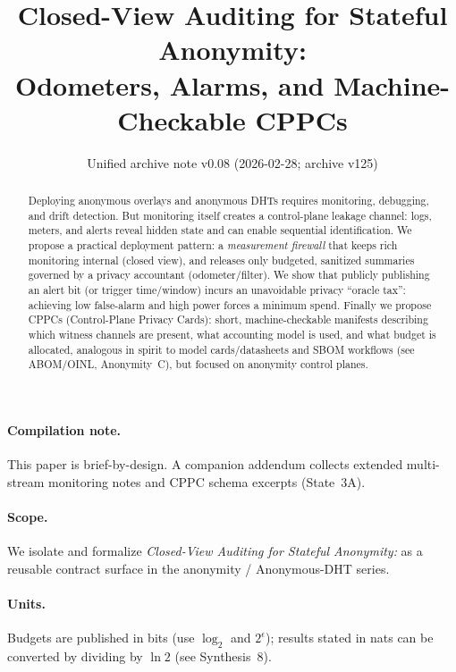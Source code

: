 \documentclass[11pt]{article}
\title{Closed-View Auditing for Stateful Anonymity:\\Odometers, Alarms, and Machine-Checkable CPPCs}
\author{}
\date{Unified archive note v0.08 (2026-02-28; archive v125)}
\begin{document}
\maketitle

\begin{abstract}
Deploying anonymous overlays and anonymous DHTs requires monitoring, debugging, and drift detection.
But monitoring itself creates a control-plane leakage channel: logs, meters, and alerts reveal hidden state
and can enable sequential identification.
We propose a practical deployment pattern: a \emph{measurement firewall} that keeps rich monitoring internal (closed view),
and releases only budgeted, sanitized summaries governed by a privacy accountant (odometer/filter).
We show that publicly publishing an alert bit (or trigger time/window) incurs an unavoidable privacy ``oracle tax'':
achieving low false-alarm and high power forces a minimum spend.
Finally we propose CPPCs (Control-Plane Privacy Cards): short, machine-checkable manifests describing
which witness channels are present, what accounting model is used, and what budget is allocated,
analogous in spirit to model cards/datasheets and SBOM workflows (see ABOM/OINL, Anonymity~C), but focused on anonymity control planes.\cite{series:abomoinl}
\end{abstract}

\paragraph{Compilation note.}
This paper is brief-by-design. A companion addendum collects extended multi-stream monitoring notes and CPPC schema excerpts (State~3A).\cite{series:state3addendum}

\paragraph{Scope.}
We isolate and formalize \emph{Closed-View Auditing for Stateful Anonymity:} as a reusable contract surface in the anonymity / Anonymous-DHT series.

\paragraph{Units.} Budgets are published in bits (use $\log_2$ and $2^{\epsilon}$); results stated in nats can be converted by dividing by $\ln 2$ (see Synthesis~8).\cite{series:notation}
\end{document}
